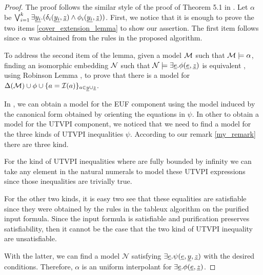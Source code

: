 \begin{proof}
  The proof follows the similar style of the proof of Theorem 
  5.1 in \cite{ghilardi2020compactly}.
  Let $\alpha$ be 
  $\bigvee_{i=1}^k \exists \underline{y_i} . (\delta_i(\underline{y_i}, \underline{z}) \land \phi_i(\underline{y_i}, \underline{z}))$.
  First, we notice that it is enough to prove the 
  two items \ref{cover_extension_lemma} to show 
  our assertion. The first item 
  follows since $\alpha$ was obtained from the rules 
  in the proposed algorithm.

  To address the second item of the lemma, given a
  model $\cal{M}$ such that $\cal{M} \models \alpha$, finding
  an isomorphic embedding $\cal{N}$ such that $\mathcal{N} \models
  \exists \underline{e} . \phi(\underline{e}, \underline{z})$ is equivalent
  , using Robinson Lemma \cite{chang2013model}, to prove that
  there is a model for $\Delta(\mathcal{M}) 
  \cup \phi 
  \cup \{ a = \mathcal{I}(a)\}_{a \in \underline{y} \cup \underline{z}}$.

  In \cite{ghilardi2020compactly}, we can obtain a model for the
  EUF component using the model induced by the canonical 
  form obtained by orienting the equations in $\psi$. In other
  to obtain a model for the UTVPI component, we noticed that
  we need to find a model for the three kinds of 
  UTVPI inequalities $\psi$. According to our remark 
  \ref{my_remark} there are three kind.

  For the kind of UTVPI inequalities where are fully bounded
  by infinity we can take any element in the natural numerals to
  model these UTVPI expressions since those inequalities are
  trivially true.

  For the other two kinds, it is easy two see that these
  equalities are satisfiable since they were obtained by
  the rules in the tableux algorithm on the purified input
  formula. Since the input formula is satisfiable and
  purification preserves satisfiability, then it cannot
  be the case that the two kind of UTVPI inequality
  are unsatisfiable. 

  With the latter, we can find a model $\mathcal{N}$
  satisfying $\exists \underline{e} . 
  \psi(\underline{e}, \underline{y}, \underline{z})$
  with the desired conditions. 
  Therefore, $\alpha$ is an uniform interpolant
  for $\exists \underline{e}. \phi(\underline{e}, \underline{z})$.

\end{proof}

